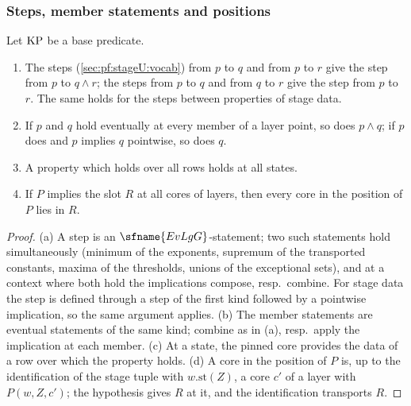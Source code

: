 \subsubsection{Steps, member statements and positions}\label{sec:pf:stageU:stepcalc}

\begin{lemma}\label{pf:stageU:steps}
Let $\mathrm{KP}$ be a base predicate.
\begin{enumerate}[label=(\alph*)]
\item The steps (\cref{sec:pf:stageU:vocab}) from $p$ to $q$ and from $p$ to $r$ give the step from $p$ to $q\wedge r$; the steps from
$p$ to $q$ and from $q$ to $r$ give the step from $p$ to $r$. The same holds for the steps between properties of stage data.
\item If $p$ and $q$ hold eventually at every member of a layer point, so does $p\wedge q$; if $p$ does and $p$ implies $q$ pointwise,
so does $q$.
\item A property which holds over all rows holds at all states.
\item If $P$ implies the slot $R$ at all cores of layers, then every core in the position of $P$ lies in $R$.
\end{enumerate}
\end{lemma}

\begin{proof}
(a) A step is an $\sfname{EvLgG}$-statement; two such statements hold simultaneously (minimum of the exponents, supremum of the
transported constants, maxima of the thresholds, unions of the exceptional sets), and at a context where both hold the
implications compose, resp.\ combine. For stage data the step is defined through a step of the first kind followed by a pointwise
implication, so the same argument applies. (b) The member statements are eventual statements of the same kind; combine as in
(a), resp.\ apply the implication at each member. (c) At a state, the pinned core provides the data of a row over which the
property holds. (d) A core in the position of $P$ is, up to the identification of the stage tuple with $w.\mathrm{st}(Z)$, a core
$c'$ of a layer with $P(w,Z,c')$; the hypothesis gives $R$ at it, and the identification transports $R$.
\end{proof}

